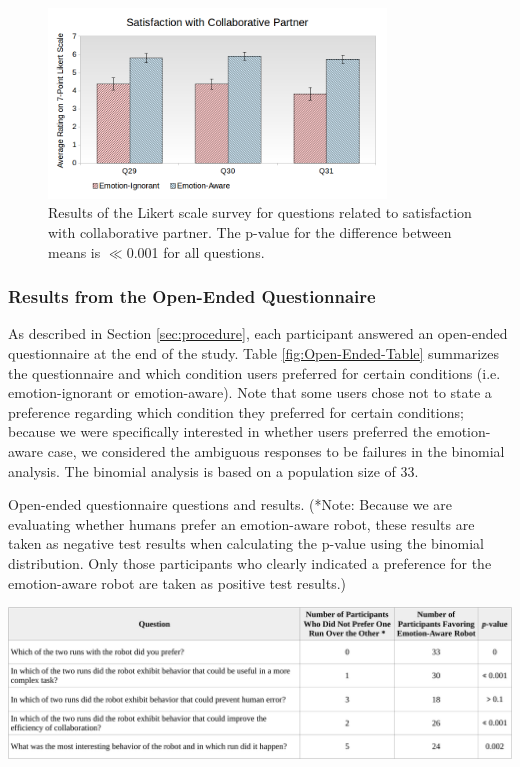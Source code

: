 \documentclass[12pt]{report}
\begin{document}
\begin{figure}
\centering
\includegraphics[width=0.8\textwidth]{figure/Overall-Satisfaction.png}
\caption{Results of the Likert scale survey for questions related to
satisfaction with collaborative partner. The p-value for the difference between
means is $\ll$0.001 for all questions.}
\label{fig:overall-satisfaction}
\end{figure}

\subsubsection{Results from the Open-Ended Questionnaire} 
\label{sec:Open-Ended}
As described in Section \ref{sec:procedure}, each participant answered an
open-ended questionnaire at the end of the study. Table
\ref{fig:Open-Ended-Table} summarizes the questionnaire and which condition
users preferred for certain conditions (i.e. emotion-ignorant or emotion-aware).
Note that some users chose not to state a preference regarding which condition
they preferred for certain conditions; because we were specifically interested
in whether users preferred the emotion-aware case, we considered the ambiguous
responses to be failures in the binomial analysis. The binomial analysis is
based on a population size of 33. 

\begin{table}[tbh]
  \centering
  \caption{Open-ended questionnaire questions and results. (*Note: Because we
  are evaluating whether humans prefer an emotion-aware robot, these results are
  taken as negative test results when calculating the p-value using the binomial
  distribution. Only those participants who clearly indicated a preference for
  the emotion-aware robot are taken as positive test results.)}
  \label{fig:Open-Ended-Table}
  \vspace*{-3mm}
  \includegraphics[width=1\textwidth]{figure/table2-croped.pdf}
\end{table}
\end{document}
